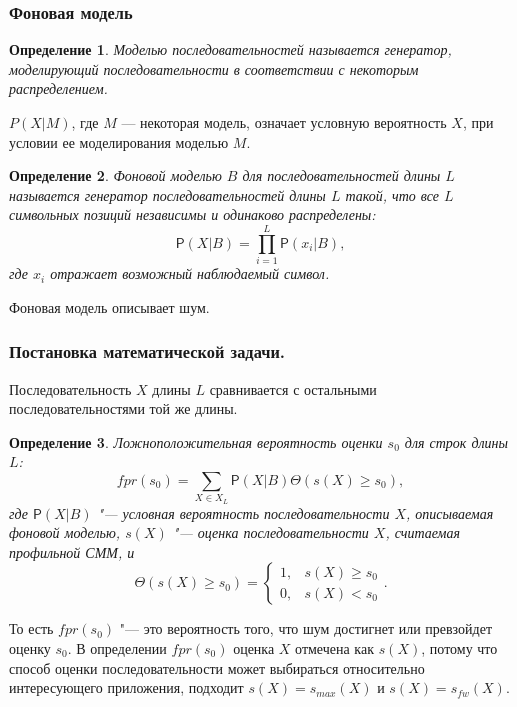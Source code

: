 \documentclass[specialist,
substylefile = spbu_report.rtx,
subf,href,colorlinks=true, 12pt]{disser}
\newtheorem{defenition}{Определение}
\begin{document}
			\subsubsection{Фоновая модель}
				\begin{defenition}
					Моделью последовательностей называется генератор, моделирующий последовательности в соответствии с некоторым распределением. 
				\end{defenition}
				
				$P(X|M)$, где $M$ --- некоторая модель, означает условную вероятность $X$, при условии ее моделирования моделью $M$.
				
				\begin{defenition}
					Фоновой моделью $B$ для последовательностей длины $L$ называется генератор последовательностей длины $L$ такой, что все $L$ символьных позиций независимы и одинаково распределены:
					\begin{equation*}
						\mathsf{P}(X|B) = \prod_{i=1}^{L}\mathsf{P}(x_{i}|B), \label{eq:4}
					\end{equation*}
					где $x_i$ отражает возможный наблюдаемый символ.
				\end{defenition}
				
				Фоновая модель описывает шум.
				
			\subsubsection{Постановка математической задачи.}
				Последовательность $X$ длины $L$ сравнивается с остальными последовательностями той же длины.
				\begin{defenition}
					Ложноположительная вероятность оценки $s_{0}$ для строк длины $L$:	
					\begin{equation*}
						fpr(s_{0}) =  \sum_{X \in X_{L}} \mathsf{P}(X|B) \Theta(s(X) \geq s_{0}), \label{eq:5}
					\end{equation*}
					где $\mathsf{P}(X|B)$ "--- условная вероятность последовательности $X$, описываемая фоновой моделью, $s(X)$ "--- оценка последовательности $X$, считаемая профильной СММ, и
					\[
					\Theta(s(X) \geq s_{0}) = 
					\begin{cases}
						1, & s(X) \geq s_{0}\\
						0, & s(X) < s_{0}
					\end{cases}.
					\]
				\end{defenition}	
				То есть $fpr(s_{0})$ "--- это вероятность того, что шум достигнет или превзойдет оценку $s_{0}$. В определении $fpr(s_{0})$ оценка $X$ отмечена как $s(X)$, потому что способ оценки последовательности может выбираться относительно интересующего приложения, подходит $s(X) = s_{max}(X)$ и $s(X) = s_{fw}(X)$.
			
\end{document}

